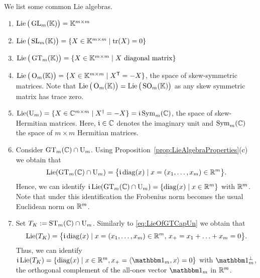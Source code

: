 \begin{example} \label{ex:LieAlgebra} We list some common Lie algebras.
	\begin{enumerate} \itemsep 1pt
		\item $\operatorname{Lie} \big( \operatorname{GL}_m(\mathbb K) \big) = \mathbb K^{m \times m}$
		
		\item $\operatorname{Lie} \big( \operatorname{SL}_m(\mathbb K) \big) = \{ X \in \mathbb K^{m \times m} \mid \operatorname{tr}(X) = 0 \}$
		
		\item $\operatorname{Lie} \big( \operatorname{GT}_m(\mathbb K) \big) = \lbrace X \in \mathbb K^{m \times m} \mid X \text{ diagonal matrix} \rbrace$
		
		\item $\operatorname{Lie} \big( \operatorname{O}_m(\mathbb K) \big) = \{ X \in \mathbb K^{m \times m} \mid X^{\mathsf{T}} = -X \}$, the space of skew-symmetric matrices. Note that $\operatorname{Lie} \big( \operatorname{O}_m(\mathbb K) \big) = \operatorname{Lie} \big( \operatorname{SO}_m(\mathbb K) \big)$ as any skew symmetric matrix has trace zero.
		
		\item $\operatorname{Lie} (\operatorname{U}_m) = \lbrace X \in \mathbb C^{m \times m} \mid X^{\dagger} = -X \rbrace = \mathfrak{i} \operatorname{Sym}_m(\mathbb C)$, the space of skew-Hermitian matrices. Here, $\mathfrak{i} \in \mathbb C$ denotes the imaginary unit and $\operatorname{Sym}_m(\mathbb C)$ the space of $m \times m$ Hermitian matrices.
		
		\item \label{item:LieOfGTCapUn}
		Consider $\operatorname{GT}_m(\mathbb C) \cap \operatorname{U}_m$. Using Proposition~\ref{prop:LieAlgebraProperties}(c) we obtain that
		\begin{equation*}\label{eq:LieOfGTCapUn}
			\operatorname{Lie} (\operatorname{GT}_m(\mathbb C) \cap \operatorname{U}_m) = \big\{ \mathfrak{i} \operatorname{diag}(x) \mid x = (x_1,\ldots,x_m) \in \mathbb R^m \big\}.
		\end{equation*}
		Hence, we can identify $\mathfrak{i} \operatorname{Lie}(\operatorname{GT}_m(\mathbb C) \cap \operatorname{U}_m) = \{ \operatorname{diag}(x) \mid x \in \mathbb R^m \}$ with $\mathbb R^m$. Note that under this identification the Frobenius norm becomes the usual Euclidean norm on $\mathbb R^m$.
		
		\item \label{item:LieOfTK}
		Set $T_K := \operatorname{ST}_m(\mathbb C) \cap \operatorname{U}_m$. Similarly to \eqref{eq:LieOfGTCapUn} we obtain that
			\begin{equation*}\label{eq:LieOfTK}
				\operatorname{Lie} (T_K) = \big\{ \mathfrak{i} \operatorname{diag}(x) \mid x = (x_1,\ldots,x_m) \in \mathbb R^m, \, x_+ = x_1 + \ldots + x_m = 0 \big\}.
			\end{equation*}
		Thus, we can identify $\imag \Lie(T_K) = \{ \diag(x) \mid x \in \RR^m, x_+ = \langle \ones_m, x \rangle = 0 \}$ with $\onePerp$, the orthogonal complement of the all-ones vector $\ones_m$ in $\mathbb R^m$.
		\hfill\exSymbol
	\end{enumerate}
\end{example}

